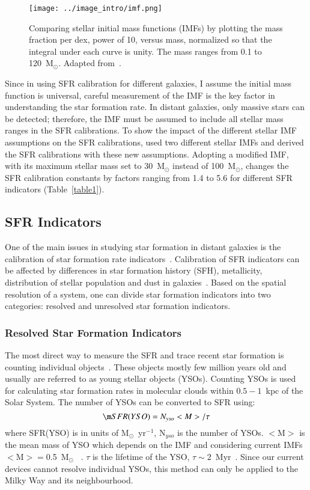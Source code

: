 \begin{figure}
\centering
\texttt{[image: ../image\_intro/imf.png]}
\small
\caption[Comparing stellar initial mass functions]{Comparing stellar initial mass functions (IMFs) by plotting the mass fraction per dex, power of 10, versus mass, normalized so that the integral under each curve is unity. The mass ranges from 0.1 to 120~M$_\odot$. Adapted from~\cite{Baldry03}.} 
\label{fig: imf}
\end{figure}


Since in using SFR calibration for different galaxies, I assume the initial mass function is universal, careful measurement of the IMF is the key factor in understanding the star formation rate. 
In distant galaxies, only massive stars can be detected; therefore, the IMF must be assumed to include all stellar mass ranges in the SFR calibrations. 
To show the impact of the different stellar IMF assumptions on the SFR calibrations, \cite{Calzetti13} used two different stellar IMFs and derived the SFR calibrations with these new assumptions.
Adopting a modified \cite{Kroupa01} IMF, with its maximum stellar mass set to 30~M$_{\odot}$ instead of 100~M$_{\odot}$, changes the SFR calibration constants by factors ranging from 1.4 to 5.6 for different SFR indicators (Table~\ref{table1}). 

\subsection{SFR Indicators}

One of the main issues in studying star formation in distant galaxies is the calibration of star formation rate indicators~\citep[e.g.,][]{Lee10}. 
Calibration of SFR indicators can be affected by differences in star formation history (SFH), metallicity, distribution of stellar population and dust in galaxies~\citep{Calzetti13}. 
Based on the spatial resolution of a system, one can divide star formation indicators into two categories: resolved and unresolved star formation indicators.

\subsubsection{Resolved Star Formation Indicators}
The most direct way to measure the SFR and trace recent star formation is counting individual objects~\citep{Kennicutt12}. 
These objects mostly few million years old and usually are referred to as young stellar objects (YSOs). 
Counting YSOs is used for calculating star formation rates in molecular clouds within $0.5- 1$~kpc of the Solar System. 
The number of YSOs can be converted to SFR using: 
\begin{equation}
{\m SFR}(YSO) = N_{yso} <M>/\tau 
\end{equation}
where SFR(YSO) is in units of M$_{\odot}$~yr$^{-1}$, N$_{yso}$ is the number of YSOs.
$<$M$>$ is the mean mass of YSO which depends on the IMF and considering current IMFs $<$M$> = $0.5~M$_{\odot}$ ~\citep[][]{Kennicutt12}. 
$\tau$ is the lifetime of the YSO,  $\tau \sim 2$~Myr~\citep{Evans09}. 
Since our current devices cannot resolve individual YSOs, this method can only be applied to the Milky Way and its neighbourhood. 

